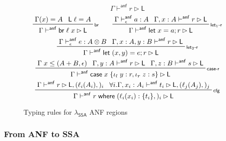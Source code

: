 \documentclass[acmsmall,screen,review]{acmart}
\newcommand{\ms}[1]{\ensuremath{\mathsf{#1}}}
\newcommand{\lto}{:}
\newcommand{\linl}[1]{\iota_l\;{#1}}
\newcommand{\linr}[1]{\iota_r\;{#1}}
\newcommand{\letstmt}[3]{\ensuremath{\ms{let}\;#1 = #2; #3}}
\newcommand{\brb}[2]{\ms{br}\;#1\;#2}
\newcommand{\casestmt}[5]{\ms{case}\;#1\;\{\linl{#2} \lto #3, \linr{#4} \lto #5\}}
\newcommand{\where}[2]{#1\;\ms{where}\;#2}
\newcommand{\wbranch}[3]{#1(#2) \lto \{#3\}}
\newcommand{\bhyp}[2]{#1 : #2}
\newcommand{\lhyp}[2]{#1(#2)}
\newcommand{\rle}[1]{{\scriptsize\textsf{#1}}}
\newcommand{\ahasty}[4]{#1 \vdash_{#2}^{\ms{anf}} #3 : {#4}}
\newcommand{\ahaslb}[3]{#1 \vdash^{\ms{anf}} #2 \rhd #3}
\newcommand{\isotopessa}{\(\lambda_{\ms{SSA}}\)}
\begin{document}
\begin{figure}
  \begin{equation*}
    \boxed{\ahaslb{\Gamma}{r}{\ms{L}}}
  \end{equation*}
  \begin{gather*}
    \prftree[r]{\rle{br}}{\Gamma(x) = A}{\ms{L}\;\ell = A}
      {\ahaslb{\Gamma}{\brb{\ell}{x}}{\ms{L}}} \qquad
    \prftree[r]{\rle{let$_1$-r}}
      {\ahasty{\Gamma}{\epsilon}{a}{A}}
      {\ahaslb{\Gamma, \bhyp{x}{A}}{r}{\ms{L}}}
      {\ahaslb{\Gamma}{\letstmt{x}{a}{r}}{\ms{L}}} \\
    \prftree[r]{\rle{let$_2$-r}}
      {\ahasty{\Gamma}{\epsilon}{e}{A \otimes B}}
      {\ahaslb{\Gamma, \bhyp{x}{A}, \bhyp{y}{B}}{r}{\ms{L}}}
      {\ahaslb{\Gamma}{\letstmt{(x, y)}{e}{r}}{\ms{L}}} \\
    \prftree[r]{\rle{case-r}}
      {\Gamma\;x \leq (A + B, \epsilon)}
      {\ahaslb{\Gamma, \bhyp{y}{A}}{r}{\ms{L}}}
      {\ahaslb{\Gamma, \bhyp{z}{B}}{s}{\ms{L}}}
      {\ahaslb{\Gamma}{\casestmt{x}{y}{r}{z}{s}}{\ms{L}}} \\
    \prftree[r]{\rle{cfg}}
      {\ahaslb{\Gamma}{r}{\ms{L}, (\lhyp{\ell_i}{A_i},)_i}}
      {\forall i. \ahaslb{\Gamma, \bhyp{x_i}{A_i}}{t_i}{\ms{L}, (\lhyp{\ell_j}{A_j},)_j}}
      {\ahaslb{\Gamma}{\where{r}{(\wbranch{\ell_i}{x_i}{t_i},)_i}}{\ms{L}}}
  \end{gather*}
  \caption{Typing rules for \isotopessa{} ANF regions}
  \Description{}
  \label{fig:ssa-anf}
\end{figure}

\subsubsection{From ANF to SSA}
\end{document}
